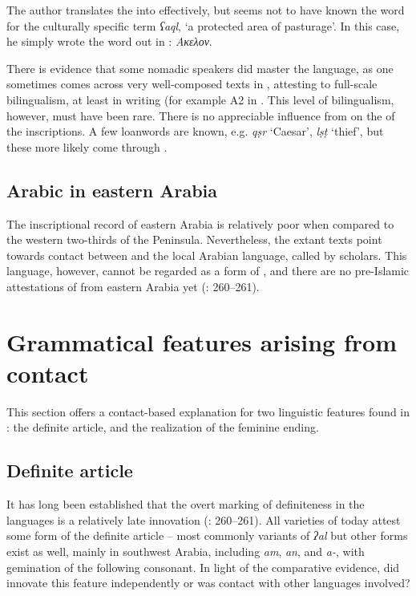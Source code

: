 \documentclass[output=paper]{langsci/langscibook}
\begin{document}
The author translates the  into  effectively, but seems not to have known the  word for the culturally specific term \textit{ʕaql}, ‘a protected area of pasturage’. In this case, he simply wrote the word out in : \textit{Ακελον}.

There is evidence that some nomadic  speakers did master the  language, as one sometimes comes across very well-composed texts in , attesting to full-scale {bilingualism}, at least in writing (for example A2 in \citet{Al-Jalladal-Manaser2015}. This level of {bilingualism}, however, must have been rare. There is no appreciable influence from  on the  of the  inscriptions. A few {loanwords} are known, e.g. \textit{qṣr} ‘Caesar’, \textit{lṣṭ} ‘thief', but these more likely come through .

\subsection{Arabic in eastern Arabia}
The inscriptional record of eastern Arabia is relatively poor when compared to the western two-thirds of the Peninsula. Nevertheless, the extant texts point towards contact between  and the local Arabian language, called  by scholars. This language, however, cannot be regarded as a form of , and there are no pre-Islamic attestations of  from eastern Arabia yet (\citealt{Al-Jallad2018ANA}: 260--261). 

\section{Grammatical features arising from contact}
This section offers a contact-based explanation for two linguistic features found in  : the {definite} {article}, and the realization of the feminine ending.

\subsection{Definite article}
It has long been established that the overt marking of {definiteness} in the  languages is a relatively late innovation (\citealt{HuehnergardRubin2011}: 260--261). All varieties of  today attest some form of the {definite} {article} -- most commonly variants of \textit{ʔal} but other forms exist as well, mainly in southwest Arabia, including \textit{am}, \textit{an}, and \textit{a-}, with gemination of the following consonant. In light of the {comparative} evidence, did  innovate this feature independently or was contact with other  languages involved?
\end{document}
